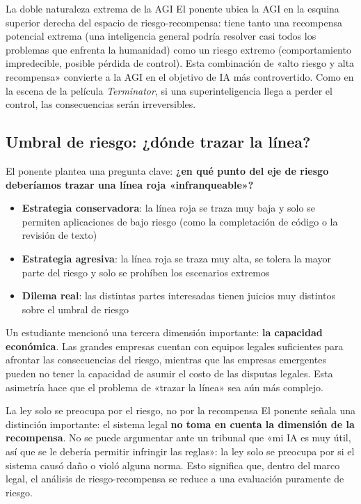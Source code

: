 \documentclass[a4paper]{article}
\begin{document}
\begin{warningbox}{La doble naturaleza extrema de la AGI}
El ponente ubica la AGI en la esquina superior derecha del espacio de riesgo-recompensa: tiene tanto una recompensa potencial extrema (una inteligencia general podría resolver casi todos los problemas que enfrenta la humanidad) como un riesgo extremo (comportamiento impredecible, posible pérdida de control). Esta combinación de «alto riesgo y alta recompensa» convierte a la AGI en el objetivo de IA más controvertido. Como en la escena de la película \textit{Terminator}, si una superinteligencia llega a perder el control, las consecuencias serán irreversibles.
\end{warningbox}

\subsection{Umbral de riesgo: ¿dónde trazar la línea?}

El ponente plantea una pregunta clave: \textbf{¿en qué punto del eje de riesgo deberíamos trazar una línea roja «infranqueable»?}

\begin{itemize}
    \item \textbf{Estrategia conservadora}: la línea roja se traza muy baja y solo se permiten aplicaciones de bajo riesgo (como la completación de código o la revisión de texto)
    \item \textbf{Estrategia agresiva}: la línea roja se traza muy alta, se tolera la mayor parte del riesgo y solo se prohíben los escenarios extremos
    \item \textbf{Dilema real}: las distintas partes interesadas tienen juicios muy distintos sobre el umbral de riesgo
\end{itemize}

Un estudiante mencionó una tercera dimensión importante: \textbf{la capacidad económica}. Las grandes empresas cuentan con equipos legales suficientes para afrontar las consecuencias del riesgo, mientras que las empresas emergentes pueden no tener la capacidad de asumir el costo de las disputas legales. Esta asimetría hace que el problema de «trazar la línea» sea aún más complejo.

\begin{knowledgebox}{La ley solo se preocupa por el riesgo, no por la recompensa}
El ponente señala una distinción importante: el sistema legal \textbf{no toma en cuenta la dimensión de la recompensa}. No se puede argumentar ante un tribunal que «mi IA es muy útil, así que se le debería permitir infringir las reglas»: la ley solo se preocupa por si el sistema causó daño o violó alguna norma. Esto significa que, dentro del marco legal, el análisis de riesgo-recompensa se reduce a una evaluación puramente de riesgo.
\end{knowledgebox}
\end{document}
